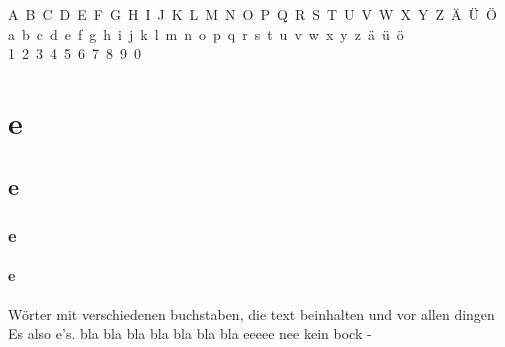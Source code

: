 \documentclass[a4paper,20pt]{article}%
\begin{document}
 \noindent
 A~B~C~D~E~F~G~H~I~J~K~L~M~N~O~P~Q~R~S~T~U~V~W~X~Y~Z~Ä~Ü~Ö\\
 a~b~c~d~e~f~g~h~i~j~k~l~m~n~o~p~q~r~s~t~u~v~w~x~y~z~ä~ü~ö\\
 1~2~3~4~5~6~7~8~9~0\\
 
 \section{e}
 \subsection{e}
 \subsubsection{e}
 \paragraph{e}
 Wörter mit verschiedenen buchstaben, die text beinhalten und vor allen dingen Es also e's.
 bla bla bla bla bla bla bla eeeee nee kein bock
 -\\
\end{document}
